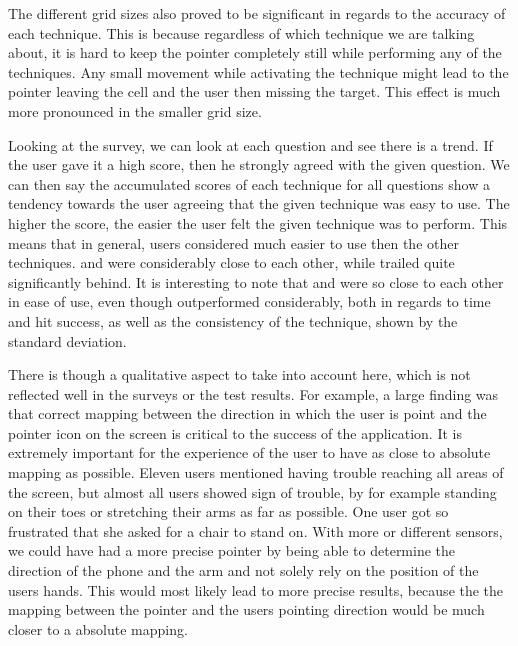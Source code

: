 The different grid sizes also proved to be significant in regards to the accuracy of each technique. This is because regardless of which technique we are talking about, it is hard to keep the pointer completely still while performing any of the techniques. Any small movement while activating the technique might lead to the pointer leaving the cell and the user then missing the target. This effect is much more pronounced in the smaller grid size.

Looking at the survey, we can look at each question and see there is a trend.
If the user gave it a high score, then he strongly agreed with the given question.
We can then say the accumulated scores of each technique for all questions show a tendency towards the user agreeing that the given technique was easy to use.
The higher the score, the easier the user felt the given technique was to perform.
This means that in general, users considered \swipe much easier to use then the other techniques. 
\throw and \tilt were considerably close to each other, while \pinch trailed quite significantly behind.
It is interesting to note that \throw and \tilt were so close to each other in ease of use, even though \throw outperformed \tilt considerably, both in regards to time and hit success, as well as the consistency of the technique, shown by the standard deviation. 

There is though a qualitative aspect to take into account here, which is not reflected well in the surveys or the test results.
For example, a large finding was that correct mapping between the direction in which the user is point and the pointer icon on the screen is critical to the success of the application.
It is extremely important for the experience of the user to have as close to absolute mapping as possible. 
Eleven users mentioned having trouble reaching all areas of the screen, but almost all users showed sign of trouble, by for example standing on their toes or stretching their arms as far as possible.
One user got so frustrated that she asked for a chair to stand on. 
With more or different sensors, we could have had a more precise pointer by being able to determine the direction of the phone and the arm and not solely rely on the position of the users hands.
This would most likely lead to more precise results, because the the mapping between the pointer and the users pointing direction would be much closer to a absolute mapping.

